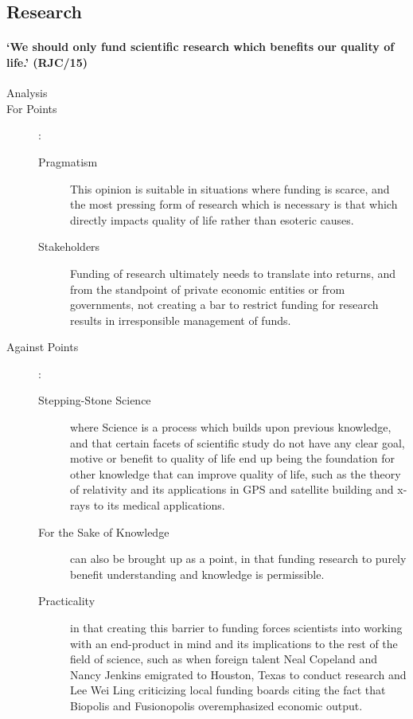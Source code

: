 \documentclass[../../main]{subfiles}
\begin{document}
\subsection{Research}

\paragraph{`We should only fund scientific research which benefits our quality of life.' (RJC/15)}

\begin{description}
	\item[Analysis]
	\item[For Points] :
		\begin{description}
			\item[Pragmatism] This opinion is suitable in situations where funding is scarce, and the most pressing form of research which is necessary is that which directly impacts quality of life rather than esoteric causes.
			\item[Stakeholders] Funding of research ultimately needs to translate into returns, and from the standpoint of private economic entities or from governments, not creating a bar to restrict funding for research results in irresponsible management of funds.
		\end{description}
	\item[Against Points] :
		\begin{description}
			\item[Stepping-Stone Science] where Science is a process which builds upon previous knowledge, and that certain facets of scientific study do not have any clear goal, motive or benefit to quality of life end up being the foundation for other knowledge that can improve quality of life, such as the theory of relativity and its applications in GPS and satellite building and x-rays to its medical applications.
			\item[For the Sake of Knowledge] can also be brought up as a point, in that funding research to purely benefit understanding and knowledge is permissible.
			\item[Practicality] in that creating this barrier to funding forces scientists into working with an end-product in mind and its implications to the rest of the field of science, such as when foreign talent Neal Copeland and Nancy Jenkins emigrated to Houston, Texas to conduct research and Lee Wei Ling criticizing local funding boards citing the fact that Biopolis and Fusionopolis overemphasized economic output.
		\end{description}
\end{description}
\end{document}
